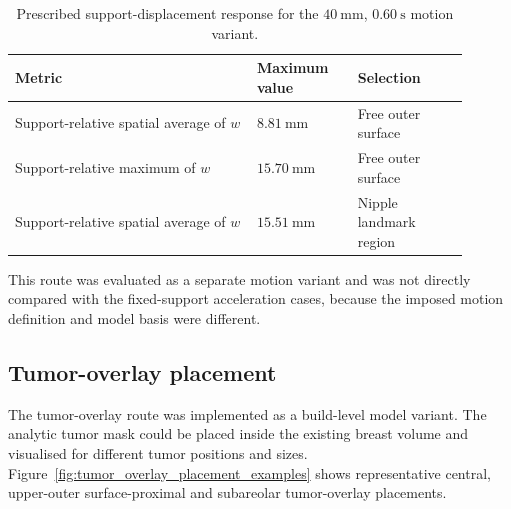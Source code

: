 \begin{table}[H]
\centering
\small
\caption{Prescribed support-displacement response for the $40~\mathrm{mm}$, $0.60~\mathrm{s}$ motion variant.}
\label{prescribed_support_displacement_results_table}
\begin{tabular}{
>{\raggedright\arraybackslash}p{0.48\linewidth}
>{\raggedleft\arraybackslash}p{0.20\linewidth}
>{\raggedright\arraybackslash}p{0.22\linewidth}
}
\toprule
Metric & Maximum value & Selection \\
\midrule
Support-relative spatial average of $w$ 
& $8.81~\mathrm{mm}$ 
& Free outer surface \\

Support-relative maximum of $w$ 
& $15.70~\mathrm{mm}$ 
& Free outer surface \\

Support-relative spatial average of $w$ 
& $15.51~\mathrm{mm}$ 
& Nipple landmark region \\
\bottomrule
\end{tabular}
\end{table}

This route was evaluated as a separate motion variant and was not directly compared with the fixed-support acceleration cases, because the imposed motion definition and model basis were different.



\subsection{Tumor-overlay placement}
\label{tumor_overlay_results}

The tumor-overlay route was implemented as a build-level model variant. The analytic tumor mask could be placed inside the existing breast volume and visualised for different tumor positions and sizes. Figure~\ref{fig:tumor_overlay_placement_examples} shows representative central, upper-outer surface-proximal and subareolar tumor-overlay placements.


